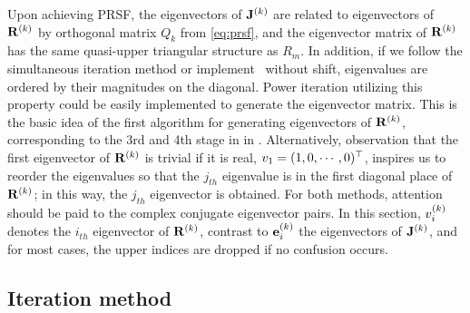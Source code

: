 \documentclass[final,leqno,onefignum,onetabnum]{siamltexmm}
\begin{document}
Upon achieving PRSF,
the eigenvectors of $\ps{\jMps}{k}$ are related to eigenvectors of
$\ps{R}{k}$ by orthogonal matrix $Q_{k}$ from \eqref{eq:prsf}, and
the
eigenvector matrix of $\ps{R}{k}$ has the same quasi-upper triangular
structure as $R_m$. In addition, if we follow the
simultaneous iteration method or
implement \psd\ without shift, eigenvalues are ordered by their
magnitudes on the diagonal. Power iteration utilizing this property
could be easily implemented to generate the eigenvector
matrix. This is the basic idea of the first algorithm for generating
eigenvectors of $\ps{R}{k}$, corresponding to the 3rd and 4th stage in
 in .
Alternatively,
observation that
the first eigenvector of $\ps{R}{k}$ is trivial if it is real,
$\Rve{1}=(1,0,\cdots,0)^\top $, inspires us to reorder the
eigenvalues so that the $j_{th}$ eigenvalue is in the first diagonal
place of $\ps{R}{k}$; in this way, the $j_{th}$ eigenvector is obtained.
For both methods, attention should be paid to the complex conjugate
eigenvector pairs. In this section, $\Rve{i}^{(k)}$
denotes the $i_{th}$ eigenvector of $\ps{R}{k}$, contrast to
$\jEigvec[i]^{(k)}$
the eigenvectors of $\ps{J}{k}$, and for most cases, the upper indices
are dropped if no confusion occurs.

\subsection{Iteration method}
\end{document}

